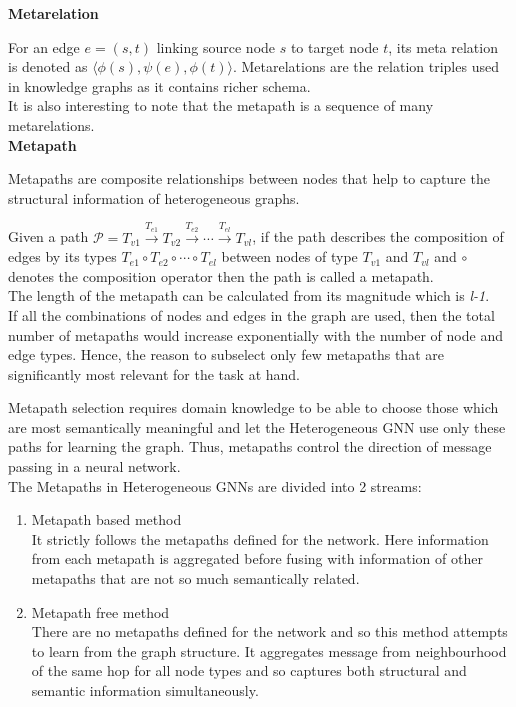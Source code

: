 \documentclass{report} %
\begin{document}
\textbf{Metarelation}

For an edge $e = (s, t)$ linking source node $s$ to target node $t$, its meta relation is denoted as $\langle \phi(s), \psi(e), \phi(t) \rangle.$
Metarelations are the relation triples used in knowledge graphs as it contains richer schema. \\
It is also interesting to note that the metapath is a sequence of many metarelations.\\

\textbf{Metapath}

Metapaths are composite relationships between nodes that help to capture the structural information of heterogeneous graphs.

Given a path $\mathcal{P} = T_{v1} \xrightarrow{T_{e1}} T_{v2} \xrightarrow{T_{e2}} \cdots \xrightarrow{T_{el}} T_{vl}$, 
if the path describes the composition of edges by its types $T_{e1} \circ T_{e2} \circ \cdots \circ T_{el}$ between nodes of type $T_{v1}$ and $T_{vl}$ and 
$\circ$ denotes the composition operator then the path is called a metapath. \\
The length of the metapath can be calculated from its magnitude which is \textit{l-1}. \\
If all the combinations of nodes and edges in the graph are used, then the total number of metapaths would 
increase exponentially with the number of node and edge types. Hence, the reason to subselect only few metapaths that are significantly most relevant for the task at hand. 

Metapath selection requires domain knowledge to be able to choose those which are most semantically meaningful and let the Heterogeneous \ac{GNN} use only these paths 
for learning the graph. Thus, metapaths control the direction of message passing in a neural network.\\

The Metapaths in Heterogeneous \ac{GNN}s are divided into 2 streams:
\begin{enumerate}[nosep]
    \item Metapath based method\\
    It strictly follows the metapaths defined for the network.
    Here information from each metapath is aggregated before fusing with information of other metapaths that are not so much semantically related.
    \item Metapath free method\\
    There are no metapaths defined for the network and so this method attempts to learn from the graph structure.
    It aggregates message from neighbourhood of the same hop for all node types and so captures both structural and semantic information simultaneously.\\
\end{enumerate}
\end{document}
